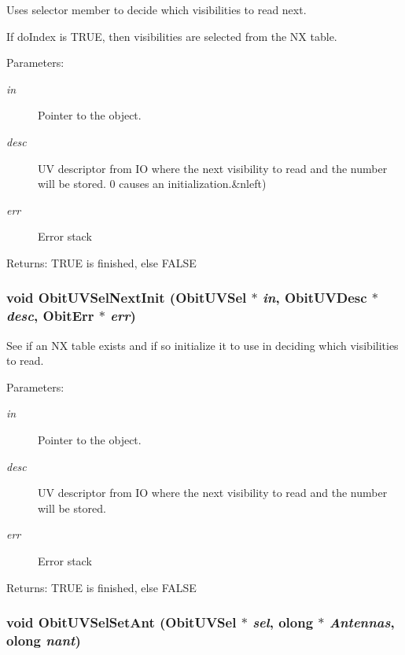 Uses selector member to decide which visibilities to read next. 

If do\-Index is TRUE, then visibilities are selected from the NX table. \begin{Desc}
\item[Parameters:]
\begin{description}
\item[{\em in}]Pointer to the object. \item[{\em desc}]UV descriptor from IO where the next visibility to read and the number will be stored. 0 causes an initialization.\&nleft) \item[{\em err}]Error stack \end{description}
\end{Desc}
\begin{Desc}
\item[Returns:]TRUE is finished, else FALSE \end{Desc}
\subsubsection{\setlength{\rightskip}{0pt plus 5cm}void Obit\-UVSel\-Next\-Init ({\bf Obit\-UVSel} $\ast$ {\em in}, {\bf Obit\-UVDesc} $\ast$ {\em desc}, {\bf Obit\-Err} $\ast$ {\em err})}\label{ObitUVSel_8h_a11}


See if an NX table exists and if so initialize it to use in deciding which visibilities to read. 

\begin{Desc}
\item[Parameters:]
\begin{description}
\item[{\em in}]Pointer to the object. \item[{\em desc}]UV descriptor from IO where the next visibility to read and the number will be stored. \item[{\em err}]Error stack \end{description}
\end{Desc}
\begin{Desc}
\item[Returns:]TRUE is finished, else FALSE \end{Desc}
\subsubsection{\setlength{\rightskip}{0pt plus 5cm}void Obit\-UVSel\-Set\-Ant ({\bf Obit\-UVSel} $\ast$ {\em sel}, {\bf olong} $\ast$ {\em Antennas}, {\bf olong} {\em nant})}\label{ObitUVSel_8h_a15}


